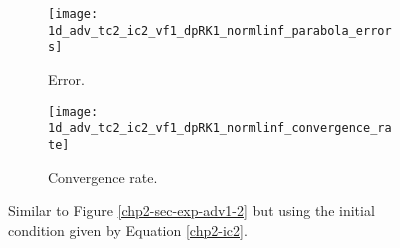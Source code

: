 \begin{figure}[!htb]
  \centering
  \begin{subfigure}{0.49\textwidth}
    \centering
		\texttt{[image: 1d\_adv\_tc2\_ic2\_vf1\_dpRK1\_normlinf\_parabola\_errors]}
		\caption{Error.\label{chp2-sec-exp-adv2-error}}
  \end{subfigure}
  \begin{subfigure}{0.49\textwidth}
    \centering
			\texttt{[image: 1d\_adv\_tc2\_ic2\_vf1\_dpRK1\_normlinf\_convergence\_rate]}
		\caption{Convergence rate.\label{chp2-sec-exp-adv2-CR}}
  \end{subfigure}
	\caption{ Similar to Figure \ref{chp2-sec-exp-adv1-2} but using
	the initial condition given by Equation \eqref{chp2-ic2}. \label{chp2-sec-exp-adv2-2}}
\end{figure}

